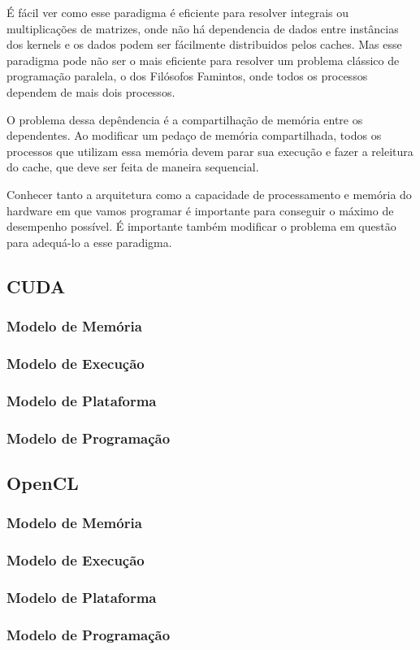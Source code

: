 É fácil ver como esse paradigma é eficiente para resolver integrais ou multiplicações de matrizes, onde não há
dependencia de dados entre instâncias dos kernels e os dados podem ser fácilmente distribuidos pelos caches.
Mas esse paradigma pode não ser o mais eficiente para resolver um problema clássico de programação paralela, o dos
Filósofos Famintos, onde todos os processos dependem de mais dois processos.

O problema dessa depêndencia é a compartilhação de memória entre os dependentes. Ao modificar um pedaço de memória
compartilhada, todos os processos que utilizam essa memória devem parar sua execução e fazer a releitura do cache,
que deve ser feita de maneira sequencial.

Conhecer tanto a arquitetura como a capacidade de processamento e memória do hardware em que vamos programar é 
importante para conseguir o máximo de desempenho possível. É importante também modificar o problema em questão 
para adequá-lo a esse paradigma.
\subsection{CUDA}
\subsubsection{Modelo de Memória}
\subsubsection{Modelo de Execução}
\subsubsection{Modelo de Plataforma}
\subsubsection{Modelo de Programação}
\subsection{OpenCL}
\subsubsection{Modelo de Memória}
\subsubsection{Modelo de Execução}
\subsubsection{Modelo de Plataforma}
\subsubsection{Modelo de Programação}
